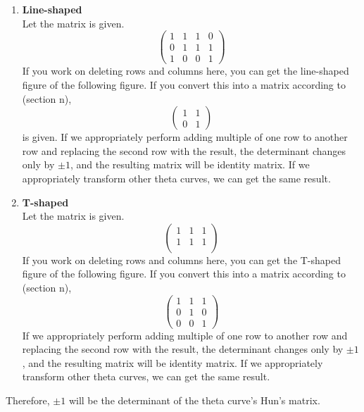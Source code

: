 \documentclass{article}
\begin{document}
\begin{enumerate}
    \item \textbf{Line-shaped}\\
    Let the matrix is given.
    $$\begin{pmatrix}
        1 & 1 & 1 & 0\\
        0 & 1 & 1 & 1\\
        1 & 0 & 0 & 1
    \end{pmatrix}$$
    If you work on deleting rows and columns here, you can get the line-shaped figure of the following figure. If you convert this into a matrix according to (section n),
    $$\begin{pmatrix}
        1 & 1 \\
        0 & 1
    \end{pmatrix}$$
    is given.
    If we appropriately perform adding multiple of one row to another row and replacing the second row with the result, the determinant changes only by $\pm 1$, and the resulting matrix will be identity matrix. If we appropriately transform other theta curves, we can get the same result.
    \item \textbf{T-shaped}\\
    Let the matrix is given.
    $$\begin{pmatrix}
        1 & 1 & 1\\
        1 & 1 & 1\\
    \end{pmatrix}$$
    If you work on deleting rows and columns here, you can get the T-shaped figure of the following figure. If you convert this into a matrix according to (section n),
    $$\begin{pmatrix}
        1 & 1 & 1\\
        0 & 1 & 0\\
        0 & 0 & 1
    \end{pmatrix}$$
    If we appropriately perform adding multiple of one row to another row and replacing the second row with the result, the determinant changes only by $\pm 1$, and the resulting matrix will be identity matrix. If we appropriately transform other theta curves, we can get the same result.
\end{enumerate}
Therefore, $\pm 1$ will be the determinant of the theta curve's Hun's matrix.
\end{document}
